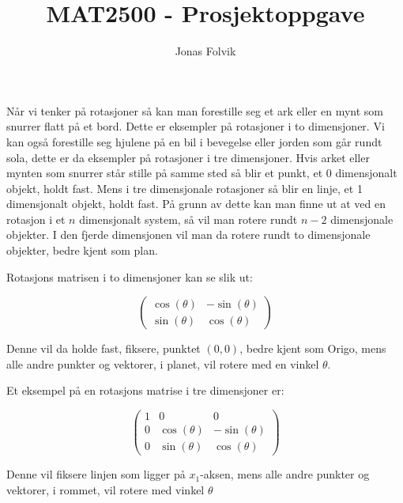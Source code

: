 \documentclass[a4paper,10pt,english]{article}
\title{MAT2500 - Prosjektoppgave}
\author{Jonas Folvik}
\begin{document}
    
    \maketitle

    Når vi tenker på rotasjoner så kan man forestille seg et ark eller en mynt som snurrer flatt på et bord. Dette er eksempler på rotasjoner i to dimensjoner.
    Vi kan også forestille seg hjulene på en bil i bevegelse eller jorden som går rundt sola, dette er da eksempler på rotasjoner i tre dimensjoner.
    Hvis arket eller mynten som snurrer står stille på samme sted så blir et punkt, et 0 dimensjonalt objekt, holdt fast. Mens i tre dimensjonale rotasjoner så blir en linje, et 1 dimensjonalt objekt, holdt fast.
    På grunn av dette kan man finne ut at ved en rotasjon i et $n$ dimensjonalt system, så vil man rotere rundt $n-2$ dimensjonale objekter.
    I den fjerde dimensjonen vil man da rotere rundt to dimensjonale objekter, bedre kjent som plan.

    Rotasjons matrisen i to dimensjoner kan se slik ut:

    $$
    \left(
    \begin{matrix}
        \cos(\theta) & -\sin(\theta) \\
        \sin(\theta) &  \cos(\theta)
    \end{matrix}
    \right)
    $$

    Denne vil da holde fast, fiksere, punktet $(0, 0)$, bedre kjent som Origo, mens alle andre punkter og vektorer, i planet, vil rotere med en vinkel $\theta$.
    
    Et eksempel på en rotasjons matrise i tre dimensjoner er:

    $$
    \left(
    \begin{matrix}
        1 & 0 & 0 \\
        0 & \cos(\theta) & -\sin(\theta) \\
        0 & \sin(\theta) &  \cos(\theta)
    \end{matrix}
    \right)
    $$

    Denne vil fiksere linjen som ligger på $x_{1}$-aksen, mens alle andre punkter og vektorer, i rommet, vil rotere med vinkel $\theta$
\end{document}
